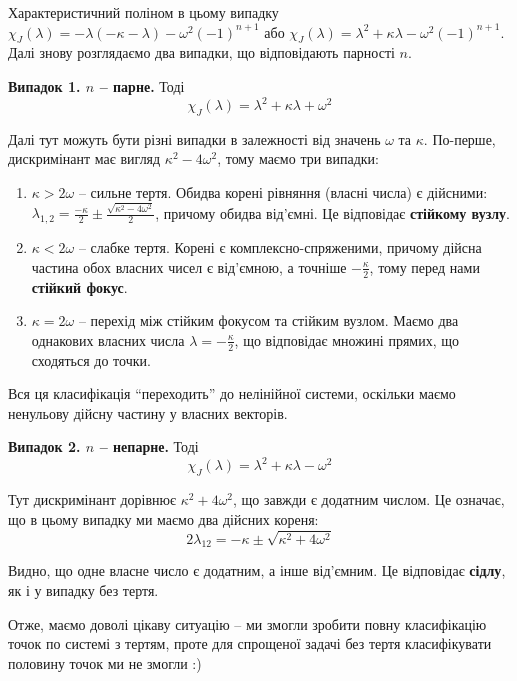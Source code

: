 \documentclass[oneside,solution]{tmpl}
\begin{document}
Характеристичний поліном в цьому випадку $\chi_J(\lambda) = -\lambda (-\kappa - \lambda) - \omega^2(-1)^{n+1}$ або $\chi_J(\lambda) = \lambda^2 + \kappa \lambda - \omega^2(-1)^{n+1}$. Далі знову розглядаємо два випадки, що відповідають парності $n$.

\textbf{Випадок 1. $n$ -- парне.} Тоді 
\begin{equation}
    \chi_J(\lambda) = \lambda^2 + \kappa \lambda + \omega^2
\end{equation}

Далі тут можуть бути різні випадки в залежності від значень $\omega$ та $\kappa$. По-перше, дискримінант має вигляд $\kappa^2-4\omega^2$, тому маємо три випадки:
\begin{enumerate}
    \item $\kappa > 2\omega$ -- сильне тертя. Обидва корені рівняння (власні числа) є дійсними: $\lambda_{1,2} = \frac{-\kappa}{2} \pm \frac{\sqrt{\kappa^2-4\omega^2}}{2}$, причому обидва від'ємні. Це відповідає \textbf{стійкому вузлу}.
    \item $\kappa < 2\omega$ -- слабке тертя. Корені є комплексно-спряженими, причому дійсна частина обох власних чисел є від'ємною, а точніше $-\frac{\kappa}{2}$, тому перед нами \textbf{стійкий фокус}. 
    \item $\kappa=2\omega$ -- перехід між стійким фокусом та стійким вузлом. Маємо два однакових власних числа $\lambda = -\frac{\kappa}{2}$, що відповідає множині прямих, що сходяться до точки.
\end{enumerate}

Вся ця класифікація ``переходить'' до нелінійної системи, оскільки маємо ненульову дійсну частину у власних векторів.

\textbf{Випадок 2. $n$ -- непарне.} Тоді
\begin{equation}
    \chi_J(\lambda) = \lambda^2 + \kappa \lambda - \omega^2
\end{equation}

Тут дискримінант дорівнює $\kappa^2 + 4\omega^2$, що завжди є додатним числом. Це означає, що в цьому випадку ми маємо два дійсних кореня:
\begin{equation}
    2\lambda_{12} = -\kappa \pm \sqrt{\kappa^2 + 4\omega^2}
\end{equation}

Видно, що одне власне число є додатним, а інше від'ємним. Це відповідає \textbf{сідлу}, як і у випадку без тертя. 

Отже, маємо доволі цікаву ситуацію -- ми змогли зробити повну класифікацію точок по системі з тертям, проте для спрощеної задачі без тертя класифікувати половину точок ми не змогли :)
\end{document}
